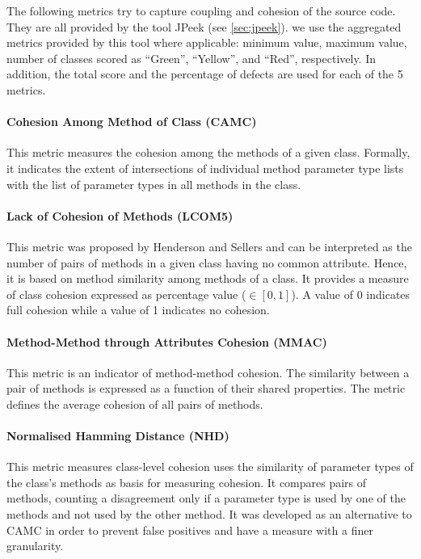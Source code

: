\documentclass{scrartcl}
\begin{document}
The following metrics try to capture coupling and cohesion of the source code.
They are all provided by the tool JPeek (see \ref{sec:jpeek}). we use the
aggregated metrics provided by this tool where applicable: minimum value,
maximum value, number of classes scored as \enquote{Green}, \enquote{Yellow},
and \enquote{Red}, respectively. In addition, the total score and the percentage
of defects are used for each of the 5 metrics.

\paragraph{Cohesion Among Method of Class (CAMC)}

This metric measures the cohesion among the methods of a given class. Formally,
it indicates the extent of intersections of individual method parameter type
lists with the list of parameter types in all methods in the class.

\paragraph{Lack of Cohesion of Methods (LCOM5)}

This metric was proposed by Henderson and Sellers and can be interpreted as the
number of pairs of methods in a given class having no common attribute. Hence,
it is based on method similarity among methods of a class. It provides a measure
of class cohesion expressed as percentage value ($\in [0,1]$). A value of 0
indicates full cohesion while a value of 1 indicates no cohesion.

\paragraph{Method-Method through Attributes Cohesion (MMAC)}

This metric is an indicator of method-method cohesion. The similarity between
a pair of methods is expressed as a function of their shared properties. The
metric defines the average cohesion of all pairs of methods.

\paragraph{Normalised Hamming Distance (NHD)}

This metric measures class-level cohesion uses the similarity of parameter types
of the class's methods as basis for measuring cohesion. It compares pairs of
methods, counting a disagreement only if a parameter type is used by one of the
methods and not used by the other method. It was developed as an alternative to
CAMC in order to prevent false positives and have a measure with a finer
granularity. 
\end{document}
